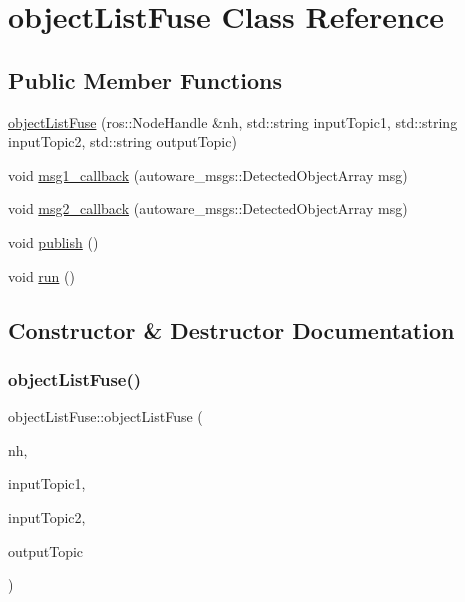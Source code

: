 \hypertarget{classobjectListFuse}{}\section{object\+List\+Fuse Class Reference}
\label{classobjectListFuse}
\subsection*{Public Member Functions}
\begin{DoxyCompactItemize}
\item 
\hyperlink{classobjectListFuse_a76784c13193153bdd352de4a86f57638}{object\+List\+Fuse} (ros\+::\+Node\+Handle \&nh, std\+::string input\+Topic1, std\+::string input\+Topic2, std\+::string output\+Topic)
\item 
void \hyperlink{classobjectListFuse_afa2b86593e97dbc3ffd64df68fb5c3e8}{msg1\+\_\+callback} (autoware\+\_\+msgs\+::\+Detected\+Object\+Array msg)
\item 
void \hyperlink{classobjectListFuse_a27a847b9b2d85a7b538af88b602cbbfa}{msg2\+\_\+callback} (autoware\+\_\+msgs\+::\+Detected\+Object\+Array msg)
\item 
void \hyperlink{classobjectListFuse_af0877c42836c4faf8b474754c82a8cd4}{publish} ()
\item 
void \hyperlink{classobjectListFuse_aa72f1c29c314488e93512d3264dc9b0e}{run} ()
\end{DoxyCompactItemize}


\subsection{Constructor \& Destructor Documentation}
\mbox{\label{classobjectListFuse_a76784c13193153bdd352de4a86f57638}} 
\subsubsection{\texorpdfstring{object\+List\+Fuse()}{objectListFuse()}}
{\footnotesize\ttfamily object\+List\+Fuse\+::object\+List\+Fuse (\begin{DoxyParamCaption}\item[{ros\+::\+Node\+Handle \&}]{nh,  }\item[{std\+::string}]{input\+Topic1,  }\item[{std\+::string}]{input\+Topic2,  }\item[{std\+::string}]{output\+Topic }\end{DoxyParamCaption})\hspace{0.3cm}{\ttfamily [inline]}}



